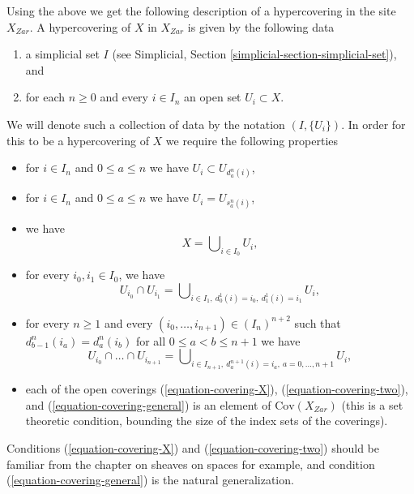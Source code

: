 \medskip\noindent
Using the above we get the following description of a hypercovering
in the site $X_{Zar}$. A hypercovering of $X$ in $X_{Zar}$
is given by the following data
\begin{enumerate}
\item a simplicial set $I$ (see
Simplicial, Section \ref{simplicial-section-simplicial-set}), and
\item for each $n \geq 0$ and every $i \in I_n$ an open set $U_i \subset X$.
\end{enumerate}
We will denote such a collection of data by the notation $(I, \{U_i\})$.
In order for this to be a hypercovering of $X$ we require
the following properties
\begin{itemize}
\item for $i \in I_n$ and $0 \leq a \leq n$
we have $U_i \subset U_{d^n_a(i)}$,
\item for $i \in I_n$ and $0 \leq a \leq n$ we have $U_i = U_{s^n_a(i)}$,
\item we have
\begin{equation}
\label{equation-covering-X}
X = \bigcup\nolimits_{i \in I_0} U_i,
\end{equation}
\item for every $i_0, i_1 \in I_0$, we have
\begin{equation}
\label{equation-covering-two}
U_{i_0} \cap U_{i_1} =
\bigcup\nolimits_{i \in I_1, \ d^1_0(i) = i_0, \ d^1_1(i) = i_1} U_i,
\end{equation}
\item for every $n \geq 1$ and every
$(i_0, \ldots, i_{n + 1}) \in (I_n)^{n + 2}$ such that
$d^n_{b - 1}(i_a) = d^n_a(i_b)$ for all $0\leq a < b\leq n + 1$
we have
\begin{equation}
\label{equation-covering-general}
U_{i_0} \cap \ldots \cap U_{i_{n + 1}} =
\bigcup\nolimits_{i \in I_{n + 1},
\ d^{n + 1}_a(i) = i_a, \ a = 0, \ldots, n + 1} U_i,
\end{equation}
\item each of the open coverings (\ref{equation-covering-X}),
(\ref{equation-covering-two}), and (\ref{equation-covering-general})
is an element of $\text{Cov}(X_{Zar})$
(this is a set theoretic condition, bounding
the size of the index sets of the coverings).
\end{itemize}
Conditions (\ref{equation-covering-X}) and
(\ref{equation-covering-two}) should be familiar from the
chapter on sheaves on spaces for example, and condition
(\ref{equation-covering-general}) is the natural generalization.

